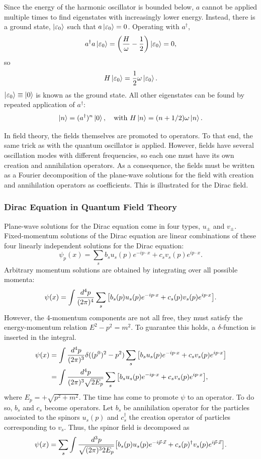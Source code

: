 Since the energy of the harmonic oscillator is bounded below, $a$ cannot be applied multiple times to find eigenstates with increasingly lower energy. Instead, there is a ground state, $\ket{\varepsilon_0}$ such that $a\ket{\varepsilon_0} = 0$. Operating with $a^{\dagger}$, $$a^{\dagger} a\ket{\varepsilon_0} = \qty(\frac{H}{\omega}-\frac{1}{2}) \ket{\varepsilon_0} =0 ,$$ so $$H\ket{\varepsilon_0} = \frac{1}{2}\omega\ket{\varepsilon_0}.$$ $\ket{\varepsilon_0} \equiv \ket{0}$ is known as the ground state. All other eigenstates can be found by repeated application of $a^{\dagger}$: $$\ket{n} = (a^{\dagger})^n \ket{0}, \quad \text{with}\ H\ket{n} = (n+1/2)\omega\ket{n}.$$


In field theory, the fields themselves are promoted to operators. To that end, the same trick as with the quantum oscillator is applied. However, fields have several oscillation modes with different frequencies, so each one must have its own creation and annihilation operators. As a consequence, the fields must be written as a Fourier decomposition of the plane-wave solutions for the field with creation and annihilation operators as coefficients. This is illustrated for the Dirac field.

\subsubsection*{Dirac Equation in Quantum Field Theory}
Plane-wave solutions for the Dirac equation come in four types, $u_{\pm}$ and $v_{\pm}$. Fixed-momentum solutions of the Dirac equation are linear combinations of these four linearly independent solutions for the Dirac equation:
$$\psi_p(x) = \sum_{s} b_{s} u_{s}(p)e^{-ip\cdot x}+ c_{s} v_{s}(p) e^{ip\cdot x}.$$ Arbitrary momentum solutions are obtained by integrating over all possible momenta:
$$\psi(x) = \int \frac{d^4 p}{(2\pi)^4} \sum_{s} \qty[ b_{s}(p) u_{s}(p)e^{-ip\cdot x}+ c_{s}(p) v_{s}(p) e^{ip\cdot x}].$$ However, the 4-momentum components are not all free, they must satisfy the energy-momentum relation $E^2-p^2 = m^2$. To guarantee this holds, a $\delta$-function is inserted in the integral. 
\begin{align*}
    \psi (x) &= \int \frac{d^4 p}{(2\pi)^3} \delta((p^0)^2-p^2)\sum_{s} \qty[ b_{s} u_{s}(p)e^{-ip\cdot x}+ c_{s} v_{s}(p) e^{ip\cdot x}] \\
    &= \int \frac{d^4 p}{(2\pi)^3\sqrt{2E_p}}\sum_{s} \qty[ b_{s} u_{s}(p)e^{-ip\cdot x}+ c_{s} v_{s}(p) e^{ip\cdot x}],
\end{align*}
where $E_p=+\sqrt{p^2+m^2}$. The time has come to promote $\psi$ to an operator. To do so, $b_s$ and $c_s$ become operators. Let $b_s$ be annihilation operator for the particles associated to the spinors $u_s(p)$ and $c_s^{\dagger}$ the creation operator of particles corresponding to $v_s$. Thus, the spinor field is decomposed as
\begin{equation}
    \psi(x) = \sum_{s} \int \frac{d^3 p}{\sqrt{(2\pi)^3 2E_p}} \qty[b_{s}(p) u_{s}(p) e^{-i\Vec{p}\cdot\Vec{x}}+ c_{s}(p)^{\dagger} v_{s}(p) e^{i\Vec{p}\cdot\vec{x}}].
\end{equation}

